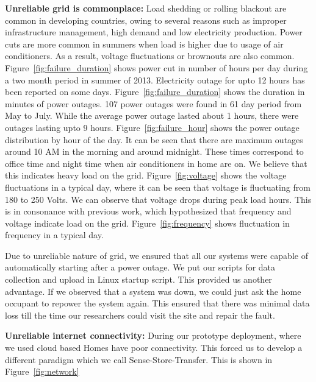 \documentclass[10pt]{sensys-proc}
\newcommand{\figref}[1]{Figure~\ref{#1}}
\begin{document}
\noindent \textbf{Unreliable grid is commonplace:} Load shedding or rolling blackout are common in developing countries, owing to several reasons such as improper infrastructure management, high demand and low electricity production. Power cuts are more common in summers when load is higher due to usage of air conditioners. As a result, voltage fluctuations or brownouts are also common. \figref{fig:failure_duration} shows power cut in number of hours per day during a two month period in summer of 2013. Electricity outage for upto 12 hours has been reported on some days. \figref{fig:failure_duration} shows the duration in minutes of power outages. 107 power outages were found in 61 day period from May to July. While the average power outage lasted about 1 hours, there were outages lasting upto 9 hours. \figref{fig:failure_hour} shows the power outage distribution by hour of the day. It can be seen that there are maximum outages around 10 AM in the morning and around midnight. These times correspond to office time and night time when air conditioners in home are on. We believe that this indicates heavy load on the grid. \figref{fig:voltage} shows the voltage fluctuations in a typical day, where it can be seen that voltage is fluctuating from 180 to 250 Volts. We can observe that voltage drops during peak load hours. This is in consonance with previous work\cite{nplug}, which hypothesized that frequency and voltage indicate load on the grid. \figref{fig:frequency} shows fluctuation in frequency in a typical day.

\noindent Due to unreliable nature of grid, we ensured that all our systems were capable of automatically starting after a power outage. We put our scripts for data collection and upload in Linux startup script. This provided us another advantage. If we observed that a system was down, we could just ask the home occupant to repower the system again. This ensured that there was minimal data loss till the time our researchers could visit the site and repair the fault.


\noindent \textbf{Unreliable internet connectivity:} During our prototype deployment, where we used cloud based 
Homes have poor connectivity. This forced us to develop a different paradigm which we call Sense-Store-Transfer. This is shown in \figref{fig:network}
	
\end{document}
